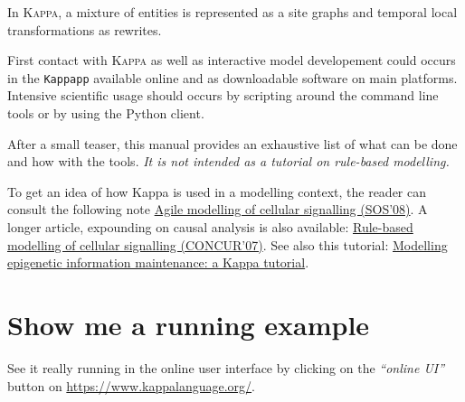 \documentclass[11pt]{book}
\def\Kappa{\textsc{Kappa}}
\begin{document}

In \Kappa{}, a mixture of entities is represented as a site graphs and
temporal local transformations as rewrites.

First contact with \Kappa{} as well as interactive model developement
could occurs in the \texttt{Kappapp} available online and as
downloadable software on main platforms. Intensive scientific usage
should occurs by scripting around the command line tools or by using the
Python client.


After a small teaser, this manual provides an exhaustive list of what
can be done and how with the tools. \emph{It is not intended as a
  tutorial on rule-based modelling.}


To get an idea of how Kappa is used in a modelling context, the reader
can consult the following note
\href{http://www.research.ed.ac.uk/portal/files/16869853/Agile_Modelling_of_Cellular_Signalling_Invited_Paper_.pdf}{Agile
  modelling of cellular signalling (SOS'08)}. A longer article,
expounding on causal analysis is also available:
\href{https://fontana.hms.harvard.edu/sites/fontana.hms.harvard.edu/files/documents/signaling.causality.pdf}{Rule-based
  modelling of cellular signalling (CONCUR'07)}. See also this
tutorial:
\href{https://hal.archives-ouvertes.fr/hal-00692430}{Modelling
  epigenetic information maintenance: a Kappa tutorial}.


\section{Show me a running example}\label{chap:abc}
See it really running in the online user interface by clicking on the
\emph{``online UI''} button on \url{https://www.kappalanguage.org/}.

\end{document}
